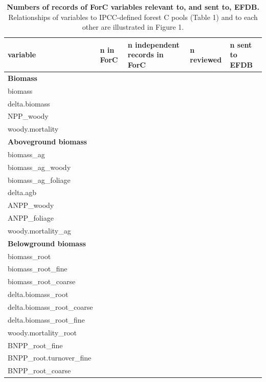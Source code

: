 \documentclass[, manuscript]{copernicus}
\begin{document}
\begin{longtabu} to 
\caption{\label{tab:table_variables}\textbf{Numbers of records of ForC variables relevant to, and sent to, EFDB.} Relationships of variables to IPCC-defined forest C pools (Table 1) and to each other are illustrated in Figure 1. }\\
\hline
\textbf{variable} & \textbf{n in ForC} & \textbf{n independent records in ForC} & \textbf{n reviewed} & \textbf{n sent to EFDB}\\
\hline
\textbf{Biomass} & \textbf{} & \textbf{} & \textbf{} & \textbf{}\\
\hline
biomass &  &  &  & \\
\hline
delta.biomass &  &  &  & \\
\hline
NPP\_woody &  &  &  & \\
\hline
woody.mortality &  &  &  & \\
\hline
\textbf{Aboveground biomass} & \textbf{} & \textbf{} & \textbf{} & \textbf{}\\
\hline
biomass\_ag &  &  &  & \\
\hline
biomass\_ag\_woody &  &  &  & \\
\hline
biomass\_ag\_foliage &  &  &  & \\
\hline
delta.agb &  &  &  & \\
\hline
ANPP\_woody &  &  &  & \\
\hline
ANPP\_foliage &  &  &  & \\
\hline
woody.mortality\_ag &  &  &  & \\
\hline
\textbf{Belowground biomass} & \textbf{} & \textbf{} & \textbf{} & \textbf{}\\
\hline
biomass\_root &  &  &  & \\
\hline
biomass\_root\_fine &  &  &  & \\
\hline
biomass\_root\_coarse &  &  &  & \\
\hline
delta.biomass\_root &  &  &  & \\
\hline
delta.biomass\_root\_coarse &  &  &  & \\
\hline
delta.biomass\_root\_fine &  &  &  & \\
\hline
woody.mortality\_root &  &  &  & \\
\hline
BNPP\_root\_fine &  &  &  & \\
\hline
BNPP\_root.turnover\_fine &  &  &  & \\
\hline
BNPP\_root\_coarse &  &  &  & \\

\end{longtabu}
\end{document}
